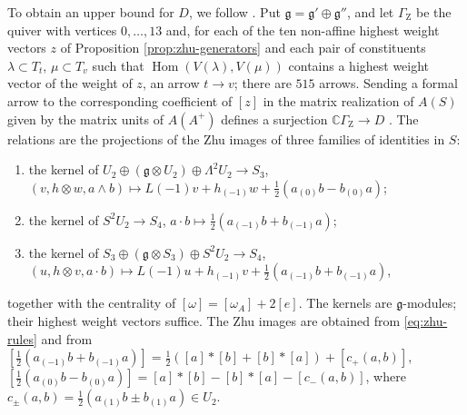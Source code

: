 \documentclass[leqno]{article}
\newcommand{\Cbb}{\ensuremath{\mathbb{C}}}
\newcommand{\ot}{\otimes}
\numberwithin{equation}{section}
\begin{document}
To obtain an upper bound for $D$, we follow \cite[Section 9]{Rie26b}. Put $\mathfrak g = \mathfrak g' \oplus \mathfrak g''$, and let $\Gamma_{\mathrm Z}$ be the quiver with vertices $0, \ldots, 13$ and, for each of the ten non-affine highest weight vectors $z$ of Proposition \ref{prop:zhu-generators} and each pair of constituents $\lambda \subset T_t$, $\mu \subset T_v$ such that $\operatorname{Hom}(V(\lambda), V(\mu))$ contains a highest weight vector of the weight of $z$, an arrow $t \to v$; there are $515$ arrows. Sending a formal arrow to the corresponding coefficient of $[z]$ in the matrix realization of $A(S)$ given by the matrix units of $A(A^+)$ defines a surjection $\Cbb\Gamma_{\mathrm Z} \to D$ \cite[Propositions 8.3 and 8.6]{Rie26b}. The relations are the projections of the Zhu images of three families of identities in $S$:
\begin{enumerate}
\item the kernel of $U_2 \oplus (\mathfrak g \ot U_2) \oplus \Lambda^2 U_2 \to S_3$, $(v, h \ot w, a \wedge b) \mapsto L(-1)v + h_{(-1)}w + \frac12(a_{(0)}b - b_{(0)}a)$;
\item the kernel of $S^2U_2 \to S_4$, $a \cdot b \mapsto \frac12(a_{(-1)}b + b_{(-1)}a)$;
\item the kernel of $S_3 \oplus (\mathfrak g \ot S_3) \oplus S^2U_2 \to S_4$, $(u, h \ot v, a \cdot b) \mapsto L(-1)u + h_{(-1)}v + \frac12(a_{(-1)}b + b_{(-1)}a)$,
\end{enumerate}
together with the centrality of $[\omega] = [\omega_A] + 2[e]$. The kernels are $\mathfrak g$-modules; their highest weight vectors suffice. The Zhu images are obtained from \eqref{eq:zhu-rules} and from $[\frac12(a_{(-1)}b + b_{(-1)}a)] = \frac12([a]*[b] + [b]*[a]) + [c_+(a,b)]$, $[\frac12(a_{(0)}b - b_{(0)}a)] = [a]*[b] - [b]*[a] - [c_-(a,b)]$, where $c_\pm(a,b) = \frac12(a_{(1)}b \pm b_{(1)}a) \in U_2$.
\end{document}
